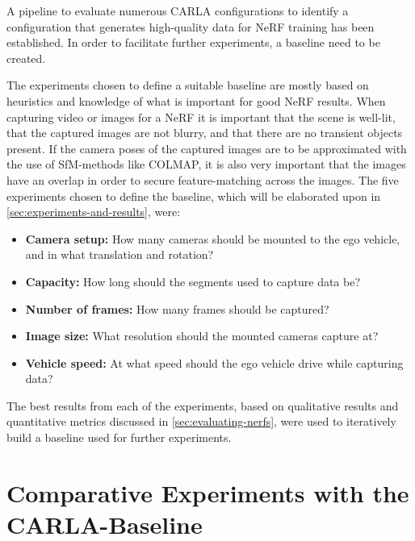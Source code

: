 A pipeline to evaluate numerous CARLA configurations to identify a configuration that generates high-quality data for NeRF training has been established. In order to facilitate further experiments, a baseline need to be created.

The experiments chosen to define a suitable baseline are mostly based on heuristics and knowledge of what is important for good NeRF results. When capturing video or images for a NeRF it is important that the scene is well-lit, that the captured images are not blurry, and that there are no transient objects present. If the camera poses of the captured images are to be approximated with the use of SfM-methods like COLMAP, it is also very important that the images have an overlap in order to secure feature-matching across the images. The five experiments chosen to define the baseline, which will be elaborated upon in \autoref{sec:experiments-and-results}, were:

\begin{itemize}
    \item \textbf{Camera setup:} How many cameras should be mounted to the ego vehicle, and in what translation and rotation?
    \item \textbf{Capacity:} How long should the segments used to capture data be?
    \item \textbf{Number of frames:} How many frames should be captured?
    \item \textbf{Image size:} What resolution should the mounted cameras capture at?
    \item \textbf{Vehicle speed:} At what speed should the ego vehicle drive while capturing data?
\end{itemize}

The best results from each of the experiments, based on qualitative results and quantitative metrics discussed in \autoref{sec:evaluating-nerfs}, were used to iteratively build a baseline used for further experiments.
















\section{Comparative Experiments with the CARLA-Baseline}
\begin{comment}
Premise: Have a CARLA-baseline for further experiments
Question: Which further experiments should I conduct?

\begin{itemize}
    \item Find the efficiency of pose refinement
\end{itemize}
\end{comment}

